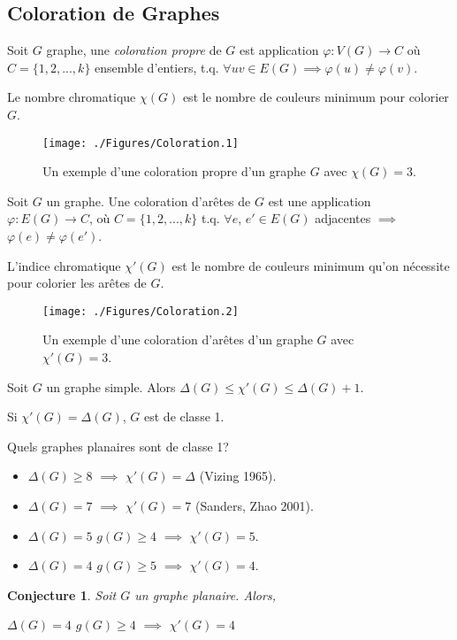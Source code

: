 \documentclass{beamer}
\newtheorem{conjecture}{Conjecture}
\begin{document}
\subsection{Coloration de Graphes}
\begin{frame}
Soit $G$ graphe, une \emph{coloration propre} de $G$ est application $\varphi: V(G) \to C$ où $C=\{1,2,...,k\}$ ensemble d'entiers, t.q. $\forall uv\in E(G) \implies\varphi(u) \neq \varphi(v)$. 

Le nombre chromatique $\chi(G)$ est le nombre de couleurs minimum pour colorier $G$.

\begin{figure}[ht]
\centerline{
\texttt{[image: ./Figures/Coloration.1]}
}
\caption{Un exemple d'une coloration propre d'un graphe $G$ avec $\chi(G)=3$.}
\end{figure}

\end{frame}
\begin{frame}
Soit $G$ un graphe. Une coloration d'arêtes de $G$ est une application $\varphi:E(G) \to C$, où $C=\{1,2,...,k\}$ t.q. $\forall e$, $e' \in E(G)$ adjacentes $\implies$ $\varphi(e) \neq \varphi(e')$. 

L'indice chromatique $\chi'(G)$ est le nombre de couleurs minimum qu'on nécessite pour colorier les arêtes de $G$.

\begin{figure}[ht]
\centerline{
\texttt{[image: ./Figures/Coloration.2]}
}
\caption{Un exemple d'une coloration d'arêtes d'un graphe $G$ avec $\chi'(G)=3$.}
\end{figure}
\end{frame}

\begin{frame}
\begin{theorem}[Vizing]
Soit $G$ un graphe simple. Alors $\Delta(G) \leq \chi'(G) \leq \Delta(G) + 1$.
\end{theorem}
Si $\chi'(G) = \Delta(G)$,  $G$ est de classe 1.

\pause
Quels graphes planaires sont de classe 1?
\begin{itemize}
\item $\Delta(G) \geq 8$ $\implies$ $\chi'(G)=\Delta$ (Vizing 1965).
\item $\Delta(G) = 7$ $\implies$ $\chi'(G)=7$ (Sanders, Zhao 2001).
\item $\Delta(G) = 5$ $g(G) \geq 4$ $\implies$ $\chi'(G) = 5$.
\item $\Delta(G) = 4$ $g(G) \geq 5$ $\implies$ $\chi'(G) = 4$.
\end{itemize}
\begin{conjecture}
Soit $G$ un graphe planaire. Alors,

$\Delta(G) = 4$ $g(G) \geq 4$ $\implies$ $\chi'(G) = 4$
\end{conjecture}
\end{frame}
\end{document}
